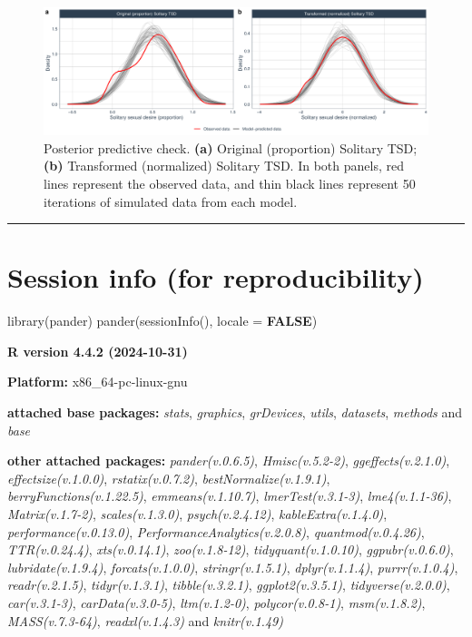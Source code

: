 \documentclass[
  bookmarksnumbered]{article}
\newenvironment{Shaded}{\begin{snugshade}}{\end{snugshade}}
\newcommand{\AttributeTok}[1]{\textcolor[rgb]{0.80,0.80,0.80}{#1}}
\newcommand{\ConstantTok}[1]{\textcolor[rgb]{0.86,0.64,0.64}{\textbf{#1}}}
\newcommand{\FunctionTok}[1]{\textcolor[rgb]{0.94,0.94,0.56}{#1}}
\newcommand{\NormalTok}[1]{\textcolor[rgb]{0.80,0.80,0.80}{#1}}
\begin{document}
\begin{figure}
\centering
\includegraphics{Sexual_Desire_Arousal_V2_files/figure-latex/ppc-m2a-1.pdf}
\caption{\label{fig:ppc-m2a}Posterior predictive check. \textbf{(a)} Original (proportion) Solitary TSD; \textbf{(b)} Transformed (normalized) Solitary TSD. In both panels, red lines represent the observed data, and thin black lines represent 50 iterations of simulated data from each model.}
\end{figure}

\begin{center}\rule{0.5\linewidth}{0.5pt}\end{center}

\section{Session info (for reproducibility)}\label{session}

\begin{Shaded}
\begin{Highlighting}[]
\FunctionTok{library}\NormalTok{(pander)}
\FunctionTok{pander}\NormalTok{(}\FunctionTok{sessionInfo}\NormalTok{(), }\AttributeTok{locale =} \ConstantTok{FALSE}\NormalTok{)}
\end{Highlighting}
\end{Shaded}

\textbf{R version 4.4.2 (2024-10-31)}

\textbf{Platform:} x86\_64-pc-linux-gnu

\textbf{attached base packages:}
\emph{stats}, \emph{graphics}, \emph{grDevices}, \emph{utils}, \emph{datasets}, \emph{methods} and \emph{base}

\textbf{other attached packages:}
\emph{pander(v.0.6.5)}, \emph{Hmisc(v.5.2-2)}, \emph{ggeffects(v.2.1.0)}, \emph{effectsize(v.1.0.0)}, \emph{rstatix(v.0.7.2)}, \emph{bestNormalize(v.1.9.1)}, \emph{berryFunctions(v.1.22.5)}, \emph{emmeans(v.1.10.7)}, \emph{lmerTest(v.3.1-3)}, \emph{lme4(v.1.1-36)}, \emph{Matrix(v.1.7-2)}, \emph{scales(v.1.3.0)}, \emph{psych(v.2.4.12)}, \emph{kableExtra(v.1.4.0)}, \emph{performance(v.0.13.0)}, \emph{PerformanceAnalytics(v.2.0.8)}, \emph{quantmod(v.0.4.26)}, \emph{TTR(v.0.24.4)}, \emph{xts(v.0.14.1)}, \emph{zoo(v.1.8-12)}, \emph{tidyquant(v.1.0.10)}, \emph{ggpubr(v.0.6.0)}, \emph{lubridate(v.1.9.4)}, \emph{forcats(v.1.0.0)}, \emph{stringr(v.1.5.1)}, \emph{dplyr(v.1.1.4)}, \emph{purrr(v.1.0.4)}, \emph{readr(v.2.1.5)}, \emph{tidyr(v.1.3.1)}, \emph{tibble(v.3.2.1)}, \emph{ggplot2(v.3.5.1)}, \emph{tidyverse(v.2.0.0)}, \emph{car(v.3.1-3)}, \emph{carData(v.3.0-5)}, \emph{ltm(v.1.2-0)}, \emph{polycor(v.0.8-1)}, \emph{msm(v.1.8.2)}, \emph{MASS(v.7.3-64)}, \emph{readxl(v.1.4.3)} and \emph{knitr(v.1.49)}
\end{document}
